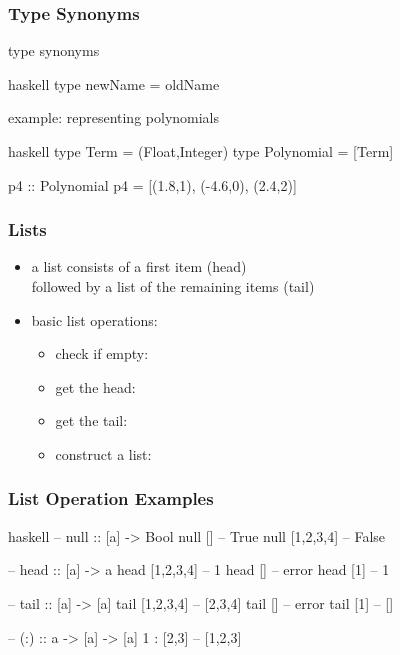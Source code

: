 \documentclass[dvipsnames]{beamer}
\theoremstyle{plain}
\begin{document}
\begin{frame}[fragile]
  \frametitle{Type Synonyms}

  \begin{block}{type synonyms}
    \begin{pygments}{haskell}
type newName = oldName
    \end{pygments}
  \end{block}

  \begin{exampleblock}{example: representing polynomials}
    \begin{pygments}{haskell}
type Term = (Float,Integer)
type Polynomial = [Term]

p4 :: Polynomial
p4 = [(1.8,1), (-4.6,0), (2.4,2)]
    \end{pygments}
  \end{exampleblock}
\end{frame}

\begin{frame}
  \frametitle{Lists}

  \begin{itemize}
    \item a list consists of a first item (\alert{head})\\
      followed by a list of the remaining items (\alert{tail})

  \medskip
    \item basic list operations:
      \begin{itemize}
        \item check if empty: 
        \item get the head: 
        \item get the tail: 
        \item construct a list: 
      \end{itemize}
  \end{itemize}
\end{frame}

\begin{frame}[fragile]
  \frametitle{List Operation Examples}

  \begin{exampleblock}{}
    \begin{pygments}{haskell}
-- null :: [a] -> Bool
null []         -- True
null [1,2,3,4]  -- False

-- head :: [a] -> a
head [1,2,3,4]  -- 1
head []         -- error
head [1]        -- 1

-- tail :: [a] -> [a]
tail [1,2,3,4]  -- [2,3,4]
tail []         -- error
tail [1]        -- []

-- (:) :: a -> [a] -> [a]
1 : [2,3]       -- [1,2,3]
    \end{pygments}
  \end{exampleblock}
\end{frame}
\end{document}
